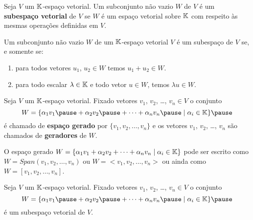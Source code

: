 \documentclass{beamer}
\begin{document}
\begin{frame}
  \begin{definicao}
    Seja $V$ um $\mathbb{K}$-espaço vetorial. \pause Um subconjunto não vazio $W$ \pause de $V$ é um \textbf{subespaço vetorial} de $V$ \pause se $W$ é um espaço vetorial
    sobre $\mathbb{K}$ \pause com respeito às mesmas operações definidas em $V$.\pause
  \end{definicao}

  \begin{teorema}
    Um subconjunto não vazio $W$ \pause de um $\mathbb{K}$-espaço vetorial $V$ \pause é um subespaço de $V$ \pause se, e somente se:
    \begin{enumerate}[label={\roman*})]
      \item para todos vetores $u_1$, $u_2 \in W$ \pause temos $u_1 + u_2 \in W$.\pause
      \item para todo escalar $\lambda \in \mathbb{K}$ \pause e todo vetor $u \in W$, \pause temos $\lambda u\in W$.
    \end{enumerate}
  \end{teorema}
\end{frame}

\begin{frame}
  \begin{definicao}
    Seja $V$ um $\mathbb{K}$-espaço vetorial. \pause Fixado vetores $v_1$, $v_2$, \dots, $v_n \in V$ \pause o conjunto
    \[
        W = \{\alpha_1v_1 \pause + \alpha_2v_2 \pause + \cdots + \alpha_nv_n \pause \mid \alpha_i \in \cp{K}\}\pause
    \]
    é chamado de \textbf{espaço gerado} \pause por $\{v_1, v_2, \dots, v_n\}$ \pause e os vetores $v_1$, $v_2$, \dots, $v_n$ \pause são chamados de \textbf{geradores} de $W$.\pause
  \end{definicao}

  \begin{notacao}
    O espaço gerado $W = \{\alpha_1v_1 + \alpha_2v_2 + \cdots + \alpha_nv_n \mid \alpha_i \in \mathbb{K}\}$ \pause pode ser escrito como $W = Span(v_1, v_2, \dots, v_n)$ \pause ou $W = <v_1, v_2, \dots, v_n>$ \pause ou ainda como $W = [v_1, v_2, \dots, v_n]$.
  \end{notacao}
\end{frame}

\begin{frame}
  \begin{proposicao}
    Seja $V$ um $\mathbb{K}$-espaço vetorial. \pause Fixado vetores $v_1$, $v_2$, \dots, $v_n \in V$ \pause o conjunto
    \[
        W = \{\alpha_1v_1 \pause + \alpha_2v_2 \pause + \cdots + \alpha_nv_n \pause \mid \alpha_i \in \cp{K}\}\pause
    \]
    é um subespaço vetorial de $V$.
  \end{proposicao}
\end{frame}
\end{document}
